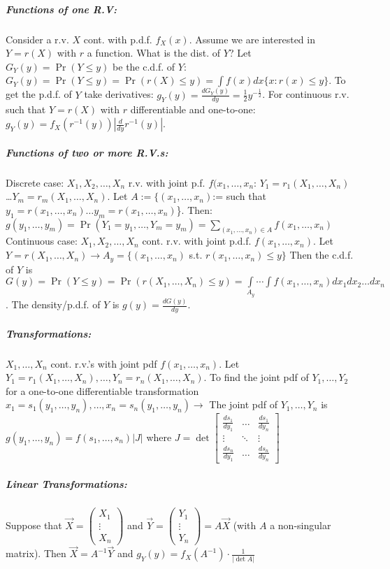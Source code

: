 \documentclass[landscape,10pt]{article}
\begin{document}
\begin{multicols}{4}
 \subparagraph*{Functions of one R.V: }
    Consider a r.v. \(X\) cont. with p.d.f. \(f_X(x)\). Assume we are interested in \(Y=r(X)\) with \(r\) a function. What is the dist. of \(Y\)? Let \(G_Y(y) = \Pr(Y \leq y)\) be the c.d.f. of \(Y\): \(G_Y(y) = \Pr(Y \leq y) = \Pr(r(X) \leq y) = \int{f(x)}dx \{x: r(x) \leq y\} \). To get the p.d.f. of \(Y\) take derivatives: \(g_Y(y) = \frac{dG_Y(y)}{dy} = \frac{1}{2} y^{-\frac{1}{2}}\). For continuous r.v. such that \(Y = r(X)\) with \(r\) differentiable and one-to-one: \(g_Y(y) = f_X(r^{-1}(y))\left|\frac{d}{dy} r^{-1} (y) \right|\).

\subparagraph*{Functions of two or more R.V.s:}
 Discrete case: \(X_1, X_2, \ldots, X_n\) r.v. with joint p.f. \(f(x_1, \ldots, x_n\):
\(Y_1 = r_1(X_1,\ldots,X_n)\) \dots \(Y_m = r_m(X_1,\ldots,X_n)\). Let \(A := \{(x_1,\ldots,x_n)\):= such that \(y_1 = r(x_1,\ldots,x_n) \dots y_m = r(x_1,\ldots,x_n)\)\}. Then: \(g(y_1,\ldots,y_m)=\Pr(Y_1=y_1,\ldots,Y_m=y_m)=\sum\limits_{(x_1,\ldots,x_n)\in A}{f(x_1,\ldots,x_n)}\) \\

Continuous case: \(X_1, X_2, \ldots, X_n\) cont. r.v. with joint p.d.f. \(f(x_1, \ldots, x_n)\). Let \(Y = r(X_1,\ldots,X_n) \rightarrow A_y = \{(x_1,\ldots,x_n)\) s.t. \(r(x_1,\ldots,x_n) \leq y\}\) Then the c.d.f. of \(Y\) is \(G(y) = \Pr(Y \leq y) = \Pr\left( r(X_1,\ldots,X_n) \leq y \right) = \int\limits_{A_y}\cdots\int{f(x_1,\ldots,x_n)}dx_1dx_2\ldots dx_n\). The density/p.d.f. of \(Y\) is \(g(y) = \frac{dG(y)}{dy}\).

\subparagraph*{Transformations: }
 \(X_1,\ldots,X_n\) cont. r.v.'s with joint pdf \(f(x_1,\ldots,x_n)\). Let \(Y_1 = r_1(X_1,\ldots,X_n), \dots, Y_n = r_n (X_1, \ldots, X_n)\). To find the joint pdf of \(Y_1, \ldots, Y_2\) for a one-to-one differentiable transformation \(x_1 = s_1 (y_1,\ldots,y_n), \dots, x_n = s_n (y_1, \ldots, y_n) \rightarrow \) The joint pdf of \(Y_1,\ldots,Y_n\) is \(g(y_1,\ldots,y_n) = f(s_1,\ldots,s_n)\left|J\right|\) where \(J = \det \begin{bmatrix}
    \frac{ds_1}{dy_1} & \dots & \frac{ds_1}{dy_n} \\
    \vdots & \ddots & \vdots \\
     \frac{ds_n}{dy_1} & \hdots & \frac{ds_n}{dy_n}
 \end{bmatrix}
 \)

 \subparagraph*{Linear Transformations: } Suppose that 
 \(\vec{X} = 
    \begin{pmatrix}
        X_1\\
        \vdots{}\\ 
        X_n
    \end{pmatrix}\) and 
\(\vec{Y} = 
    \begin{pmatrix}
        Y_1\\
        \vdots{} \\
        Y_n
    \end{pmatrix}
    = A\vec{X}\) (with \(A\) a non-singular matrix). Then \(\vec{X} = A^{-1}\vec{Y}\) and \(g_Y(y) = f_X(A^{-1})\cdot\frac{1}{\left|\det A\right|}\)


\end{multicols}
\end{document}
